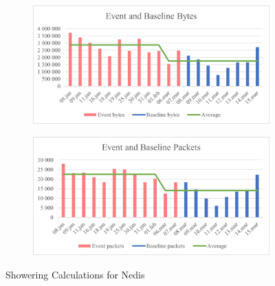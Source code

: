\begin{figure}[H]
    \centering
    \begin{subfigure}{1\textwidth}
        \centering
        \includegraphics[width=1\hsize]{figures/Nedis_Shower_Calculations_Bytes.png} 
    \end{subfigure}
    \begin{subfigure}{1\textwidth}
        \centering
        \includegraphics[width=1\hsize]{figures/Nedis_Shower_Calculations_Packets.png} 
    \end{subfigure}
    \caption{Showering Calculations for Nedis}
    \label{fig:NedisShowerCalculations}
\end{figure}

